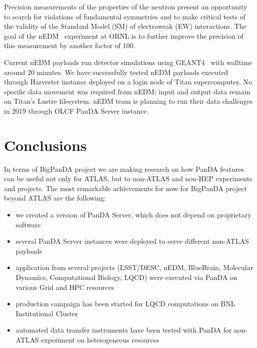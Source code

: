 \documentclass{webofc}
\begin{document}
Precision measurements of the properties of the neutron present an opportunity to search for violations of fundamental symmetries and to make critical tests of the validity of the Standard Model (SM) of electroweak (EW) interactions. 
The goal of the nEDM~\cite{Lamoreaux_2009} experiment at ORNL is to further improve the precision of this measurement by another factor of 100.


Current nEDM payloads run detector simulations using GEANT4~\cite{AGOSTINELLI2003250} with walltime around 20 minutes. We have successfully tested nEDM payloads executed through Harvester instance deployed on a login node of Titan supercomputer. No specific data movement was required from nEDM; input and output data remain on Titan’s Lustre filesystem. nEDM team is planning to run their data challenges in 2019 through OLCF PanDA Server instance.


\section{Conclusions}

In terms of BigPanDA project we are making research on how PanDA features can be useful not only for ATLAS, but to non-ATLAS and non-HEP experiments and projects.
The most remarkable achievements for now for BigPanDA project beyond ATLAS are the following:

\begin{itemize}
	\item we created a version of PanDA Server, which does not 	depend on proprietary software
	\item several PanDA Server instances were deployed to serve different non-ATLAS payloads
	\item application from several projects (LSST/DESC, nEDM, BlueBrain, Molecular Dynamics, Computational Biology, LQCD) were executed via PanDA on various Grid and HPC resources
	\item production campaign has been started for LQCD computations on BNL Institutional Cluster
	\item automated data transfer instruments have been tested with PanDA for non-ATLAS experiment on heterogeneous resources
\end{itemize}
\end{document}
